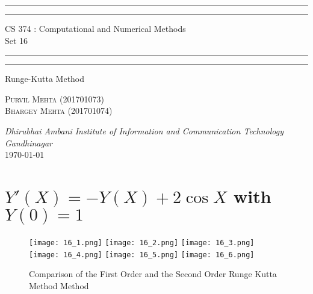 \documentclass{article}
\begin{document}
\begin{titlepage}
	\centering 
	\scshape
	\vspace*{\baselineskip}
	\rule{\textwidth}{1.6pt}\vspace*{-\baselineskip}\vspace*{2pt}
	\rule{\textwidth}{0.4pt} 
	\vspace{0.75\baselineskip}
	
	{\Large CS 374 : Computational and Numerical Methods \\\vspace{0.75\baselineskip} Set 16}
	\vspace{0.75\baselineskip}
	
	\rule{\textwidth}{0.4pt}\vspace*{-\baselineskip}\vspace{3.2pt} 
	\rule{\textwidth}{1.6pt}
	
	\vspace{2\baselineskip}  
	Runge-Kutta Method
	
	\vspace*{3\baselineskip}
	
	\vspace{0.5\baselineskip} %
	
	{\scshape\large Purvil Mehta (201701073) \\ Bhargey Mehta (201701074) \\} 
	
	\vspace{1\baselineskip} 
	
	\textit{Dhirubhai Ambani Institute of Information and Communication Technology \\ Gandhinagar\\} 
	\vspace*{2\baselineskip}
	\today


\end{titlepage}

\newpage

\section{$Y'(X) = -Y(X) + 2\cos{X}$ with $Y(0) = 1$}
\begin{figure}[!h]
    \centering
    \texttt{[image: 16\_1.png]}
    \texttt{[image: 16\_2.png]}
    \texttt{[image: 16\_3.png]}
    \texttt{[image: 16\_4.png]}
    \texttt{[image: 16\_5.png]}
    \texttt{[image: 16\_6.png]}
    \caption{Comparison of the First Order and the Second Order Runge Kutta Method Method}
\end{figure}
\end{document}
